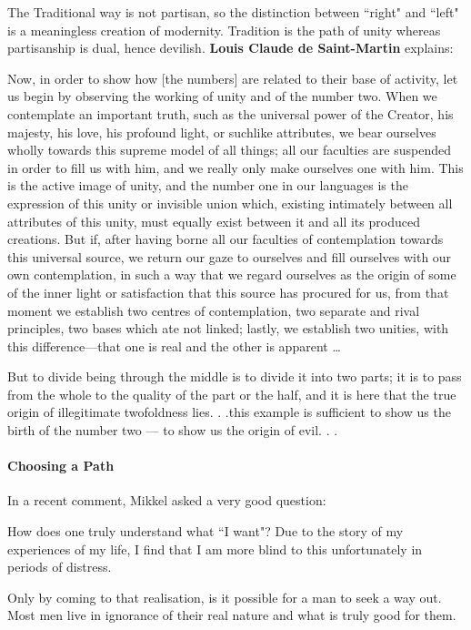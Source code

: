 The Traditional way is not partisan, so the distinction between ``right" and ``left" is a meaningless creation of modernity. Tradition is the path of unity whereas partisanship is dual, hence devilish. \textbf{Louis Claude de Saint-Martin} explains:

\begin{quotex}
Now, in order to show how [the numbers] are related to their base of activity, let us begin by observing the working of unity and of the number two. When we contemplate an important truth, such as the universal power of the Creator, his majesty, his love, his profound light, or suchlike attributes, we bear ourselves wholly towards this supreme model of all things; all our faculties are suspended in order to fill us with him, and we really only make ourselves one with him. This is the active image of unity, and the number one in our languages is the expression of this unity or invisible union which, existing intimately between all attributes of this unity, must equally exist between it and all its produced creations. But if, after having borne all our faculties of contemplation towards this universal source, we return our gaze to ourselves and fill ourselves with our own contemplation, in such a way that we regard ourselves as the origin of some of the inner light or satisfaction that this source has procured for us, from that moment we establish two centres of contemplation, two separate and rival principles, two bases which ate not linked; lastly, we establish two unities, with this difference—that one is real and the other is apparent … 

But to divide being through the middle is to divide it into two parts; it is to pass from the whole to the quality of the part or the half, and it is here that the true origin of illegitimate twofoldness lies. . .this example is sufficient to show us the birth of the number two — to show us the origin of evil. . . 

\end{quotex}
\paragraph{Choosing a Path}
In a recent comment, Mikkel asked a very good question:

\begin{quotex}
How does one truly understand what ``I want"? Due to the story of my experiences of my life, I find that I am more blind to this unfortunately in periods of distress. 

\end{quotex}
Only by coming to that realisation, is it possible for a man to seek a way out. Most men live in ignorance of their real nature and what is truly good for them.

